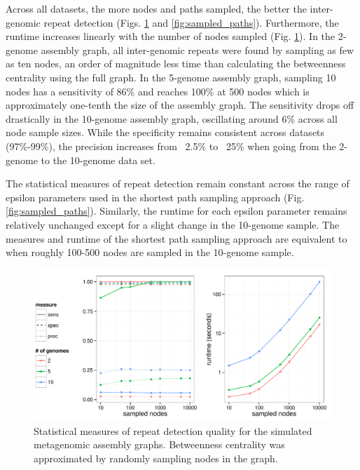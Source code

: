 \documentclass[runningheads,a4paper]{llncs}
\begin{document}
Across all datasets, the more nodes and paths sampled, the better the inter-genomic repeat detection (Figs. \ref{fig:sampled_nodes} and \ref{fig:sampled_paths}).
Furthermore, the runtime increases linearly with the number of nodes sampled (Fig. \ref{fig:sampled_nodes}).
In the 2-genome assembly graph, all inter-genomic repeats were found by sampling as few as ten nodes, an order of magnitude less time than calculating the betweenness centrality using the full graph.
In the 5-genome assembly graph, sampling 10 nodes has a sensitivity of 86\% and reaches 100\% at 500 nodes which is approximately one-tenth the size of the assembly graph.
The sensitivity drops off drastically in the 10-genome assembly graph, oscillating around 6\% across all node sample sizes.
While the specificity remains consistent across datasets (97\%-99\%), the precision increases from ~2.5\% to ~25\% when going from the 2-genome to the 10-genome data set.

The statistical measures of repeat detection remain constant across the range of epsilon parameters used in the shortest path sampling approach (Fig. \ref{fig:sampled_paths}).
Similarly, the runtime for each epsilon parameter remains relatively unchanged except for a slight change in the 10-genome sample.
The measures and runtime of the shortest path sampling approach are equivalent to when roughly 100-500 nodes are sampled in the 10-genome sample.

\begin{figure}[htbp]
\centering
\includegraphics[width = \textwidth]{sampled_nodes}
\caption{Statistical measures of repeat detection quality for the simulated metagenomic assembly graphs. Betweenness centrality was approximated by randomly sampling nodes in the graph.}
\label{fig:sampled_nodes}
\end{figure}
\end{document}
